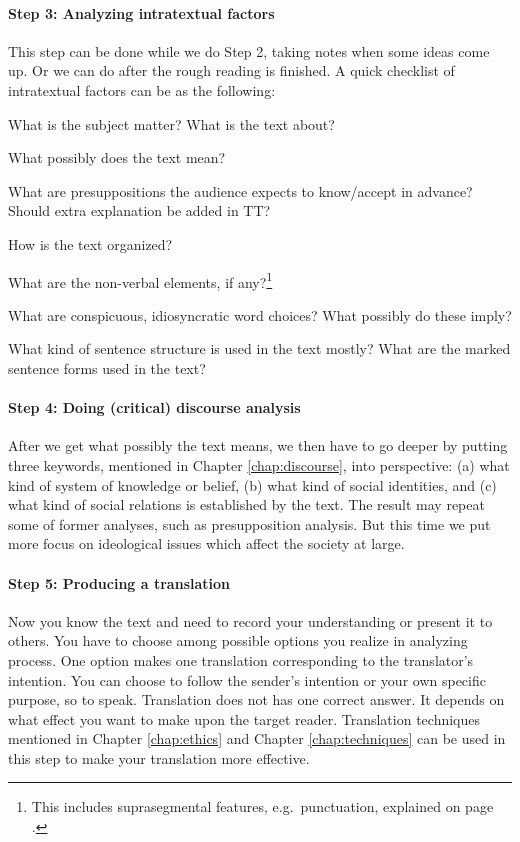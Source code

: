 \paragraph*{Step 3: Analyzing intratextual factors} This step can be done while we do Step 2, taking notes when some ideas come up. Or we can do after the rough reading is finished. A quick checklist of intratextual factors can be as the following:

\begin{compactenum}[(1)]
\item What is the subject matter? What is the text about?
\item What possibly does the text mean?
\item What are presuppositions the audience expects to know/accept in advance? Should extra explanation be added in TT?
\item How is the text organized?
\item What are the non-verbal elements, if any?\footnote{This includes suprasegmental features, e.g.\ punctuation, explained on page \pageref{par:suprasegment}.}
\item What are conspicuous, idiosyncratic word choices? What possibly do these imply?
\item What kind of sentence structure is used in the text mostly? What are the marked sentence forms used in the text?
\end{compactenum}

\paragraph*{Step 4: Doing (critical) discourse analysis} After we get what possibly the text means, we then have to go deeper by putting three keywords, mentioned in Chapter \ref{chap:discourse}, into perspective: (a) what kind of system of knowledge or belief, (b) what kind of social identities, and (c) what kind of social relations is established by the text. The result may repeat some of former analyses, such as presupposition analysis. But this time we put more focus on ideological issues which affect the society at large.

\paragraph*{Step 5: Producing a translation} Now you know the text and need to record your understanding or present it to others. You have to choose among possible options you realize in analyzing process. One option makes one translation corresponding to the translator's intention. You can choose to follow the sender's intention or your own specific purpose, so to speak. Translation does not has one correct answer. It depends on what effect you want to make upon the target reader. Translation techniques mentioned in Chapter \ref{chap:ethics} and Chapter \ref{chap:techniques} can be used in this step to make your translation more effective.

